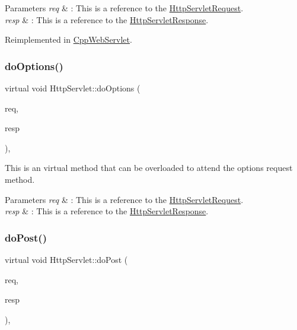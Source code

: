 \begin{DoxyParams}{Parameters}
{\em req} & \+: This is a reference to the \hyperlink{class_http_servlet_request}{Http\+Servlet\+Request}. \\
\hline
{\em resp} & \+: This is a reference to the \hyperlink{class_http_servlet_response}{Http\+Servlet\+Response}. \\
\hline
\end{DoxyParams}


Reimplemented in \hyperlink{class_cpp_web_servlet_a8d32d5ba8ba73c10a7c1abc81497d898}{Cpp\+Web\+Servlet}.

\mbox{\label{class_http_servlet_ad3d2af59b5e29adeab0c37b7239eb334}} 
\subsubsection{\texorpdfstring{do\+Options()}{doOptions()}}
{\footnotesize\ttfamily virtual void Http\+Servlet\+::do\+Options (\begin{DoxyParamCaption}\item[{\hyperlink{class_http_servlet_request}{Http\+Servlet\+Request} \&}]{req,  }\item[{\hyperlink{class_http_servlet_response}{Http\+Servlet\+Response} \&}]{resp }\end{DoxyParamCaption})\hspace{0.3cm}{\ttfamily [inline]}, {\ttfamily [virtual]}}



This is an virtual method that can be overloaded to attend the options request method. 


\begin{DoxyParams}{Parameters}
{\em req} & \+: This is a reference to the \hyperlink{class_http_servlet_request}{Http\+Servlet\+Request}. \\
\hline
{\em resp} & \+: This is a reference to the \hyperlink{class_http_servlet_response}{Http\+Servlet\+Response}. \\
\hline
\end{DoxyParams}
\mbox{\label{class_http_servlet_a88ef9c374d4cc81b245b20e544937f60}} 
\subsubsection{\texorpdfstring{do\+Post()}{doPost()}}
{\footnotesize\ttfamily virtual void Http\+Servlet\+::do\+Post (\begin{DoxyParamCaption}\item[{\hyperlink{class_http_servlet_request}{Http\+Servlet\+Request} \&}]{req,  }\item[{\hyperlink{class_http_servlet_response}{Http\+Servlet\+Response} \&}]{resp }\end{DoxyParamCaption})\hspace{0.3cm}{\ttfamily [inline]}, {\ttfamily [virtual]}}



